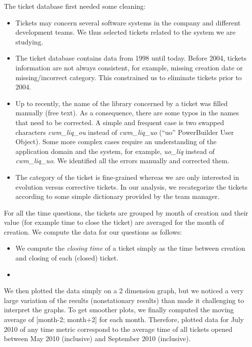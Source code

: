 \documentclass[10pt,conference]{IEEEtran}
\begin{document}
The ticket database first needed some cleaning:
\begin{itemize}
  \item Tickets may concern several software systems in the company and different development teams.
  We thus selected tickets related to the system we are studying.
  
  \item The ticket database contains data from 1998  until today. 
  Before 2004, tickets information are not always consistent, for example, missing creation date or missing/incorrect category.
  This constrained us to eliminate tickets prior to 2004.

  \item Up to recently, the name of the library concerned by a ticket was filled manually (free text).
  As a consequence, there are some typos in the names that need to be corrected.
  A simple and frequent case is two swapped characters \emph{cwm\_liq\_ou} instead of \emph{cwm\_liq\_uo} (``uo'' PowerBuilder User Object).
  Some more complex cases require an understanding of the application domain and the system, for example, \emph{uo\_liq} instead of \emph{cwm\_liq\_uo}.
  We identified all the errors manually and corrected them.
  
  \item The category of the ticket is fine-grained whereas we are only interested in evolution versus corrective tickets.
  In our analysis, we recategorize the tickets according to some simple dictionary provided by the team manager.
  
\end{itemize}
 
For all the time questions, the tickets are grouped by month of creation and their value (for example time to close the ticket) are averaged for the month of creation.  
We compute the data for our questions as follows:
\begin{itemize}
  \item We compute the \emph{closing time} of a ticket simply as the time between creation and closing of each (closed) ticket.
\item %
\end{itemize}

We then plotted the data simply on a 2 dimension graph, but we noticed a very large variation of the results (nonstationary results) than made it challenging to interpret the graphs.
To get smoother plots, we finally computed the moving average of [month-2; month+2] for each month.
Therefore, plotted data for July 2010 of any time metric correspond to the average time of all tickets opened between May 2010 (inclusive) and September 2010 (inclusive).
\end{document}
